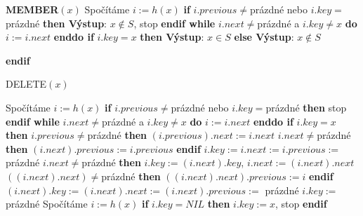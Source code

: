 \documentclass[a4paper,12pt]{article}
\begin{document}
{\bf MEMBER$(x)$}\newline 
Spočítáme $i:=h(x)$\newline 
{\bf if} $i.previous\ne$prázdné nebo $i.key=$prázdné {\bf then Výstup}: $
x\notin S$, stop {\bf endif \newline 
while} $i.next\ne$prázdné a $i.key\ne x$ {\bf do} $i:=i.next$ {\bf enddo\newline 
if} $i.key=x$ {\bf then Výstup}: $x\in S$ {\bf else Výstup}: $
x\notin S$ {\bf endif

DELETE$(x)$}\newline 
Spočítáme $i:=h(x)$\newline 
{\bf if} $i.previous\ne$prázdné nebo $i.key=$prázdné {\bf then} stop {\bf endif\newline 
while} $i.next\ne$prázdné a $i.key\ne x$ {\bf do} $i:=i.next$ {\bf enddo \newline 
if} $i.key=x$ {\bf then}\newline  
\phantom{---}{\bf if} $i.previous\ne$prázdné {\bf then}\newline 
\phantom{------}$(i.previous).next:=i.next$\newline 
\phantom{------}{\bf if} $i.next\ne$prázdné {\bf then} $(i.n
ext).previous:=i.previous$ {\bf endif}\newline 
\phantom{------}$i.key:=i.next:=i.previous:=$ prázdné \newline 
\phantom{---}{\bf else}\newline 
\phantom{------}{\bf if} $i.next\ne$prázdné {\bf then}\newline 
\phantom{---------}$i.key:=(i.next).key$, $i.next:=(i.next).next$\newline 
\phantom{---------}{\bf if} $((i.next).next)\ne$prázdné {\bf then} $
((i.next).next).previous:=i$ {\bf endif}\newline 
\phantom{---------}$(i.next).key:=(i.next).next:=(i.next).previous:=$ prázdné \newline 
\phantom{------}{\bf else}\newline 
\phantom{---------}$i.key:=$ prázdné \newline 
\phantom{------}{\bf endif}\newline 
\phantom{---}{\bf endif\newline 
endif


INSERT$(x)$}\newline 
Spočítáme $i:=h(x)$\newline
{\bf if} $i.key=NIL$ {\bf then} $i.key:=x$, stop {\bf endif}\newline 
\end{document}
